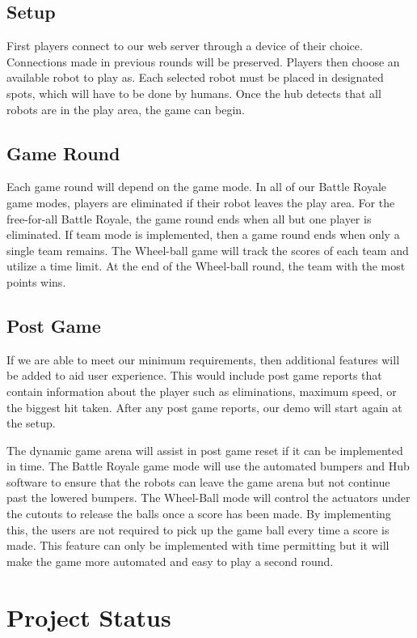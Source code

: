 \documentclass[11pt]{ieeeconf}
\begin{document}
\subsection{Setup}
First players connect to our web server through a device of their choice. Connections made in previous rounds will be preserved. Players then choose an available robot to play as. Each selected robot must be placed in designated spots, which will have to be done by humans. Once the hub detects that all robots are in the play area, the game can begin. 

\subsection{Game Round}
Each game round will depend on the game mode. In all of our Battle Royale game modes, players are eliminated if their robot leaves the play area. For the free-for-all Battle Royale, the game round ends when all but one player is eliminated. If team mode is implemented, then a game round ends when only a single team remains. The Wheel-ball game will track the scores of each team and utilize a time limit. At the end of the Wheel-ball round, the team with the most points wins.  

\subsection{Post Game}
If we are able to meet our minimum requirements, then additional features will be added to aid user experience. This would include post game reports that contain information about the player such as eliminations, maximum speed, or the biggest hit taken. After any post game reports, our demo will start again at the setup.

The dynamic game arena will assist in post game reset if it can be implemented in time. The Battle Royale game mode will use the automated bumpers and Hub software to ensure that the robots can leave the game arena but not continue past the lowered bumpers. The Wheel-Ball mode will control the actuators under the cutouts to release the balls once a score has been made. By implementing this, the users are not required to pick up the game ball every time a score is made. This feature can only be implemented with time permitting but it will make the game more automated and easy to play a second round. 

\section{Project Status}
\end{document}
